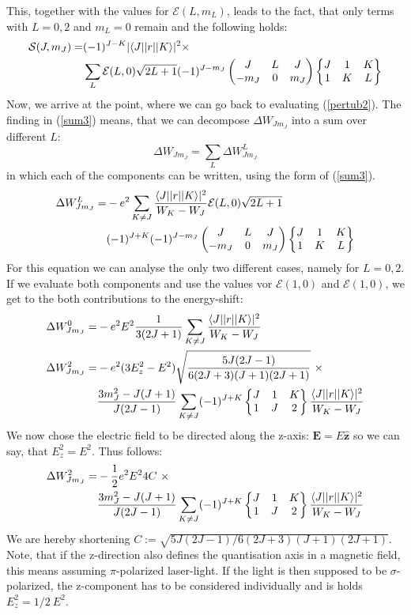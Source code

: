 This, together with the values for $\mathcal{E}(L,m_L)$, leads to the fact, that only terms with $L=0,2$ and $m_L=0$ remain and the following holds:
\begin{align}
\mathcal{S}(J,m_J)=&(-1)^{J-K}|\langle J| |r| | K\rangle|^2\times\notag\\&\sum_{L}\mathcal{E}(L,0)\sqrt{2L+1} (-1)^{J-m_J}\begin{pmatrix}J&L&J\\-m_J&0&m_J\end{pmatrix}\begin{Bmatrix}J&1&K\\1&K&L\end{Bmatrix}\label{sum3}
\end{align}
Now, we arrive at the point, where we can go back to evaluating (\ref{pertub2}). The finding in (\ref{sum3}) means, that we can decompose $\Delta W_{Jm_J}$ into a sum over different $L$:
\begin{equation}
\Delta W_{Jm_J}=\sum_L\Delta W^L_{Jm_J}
\end{equation}
in which each of the components can be written, using the form of (\ref{sum3}).
\begin{align}
\Delta W^L_{Jm_J}=&-e^2\sum_{K\neq J}\frac{\langle J| |r| | K\rangle|^2}{W_K-W_J}\mathcal{E}(L,0)\sqrt{2L+1}\notag\\&(-1)^{J+K} (-1)^{J-m_J}\begin{pmatrix}J&L&J\\-m_J&0&m_J\end{pmatrix}\begin{Bmatrix}J&1&K\\1&K&L\end{Bmatrix}\label{pertub4}
\end{align}
For this equation we can analyse the only two different cases, namely for $L=0,2$. If we evaluate both components and use the values vor $\mathcal{E}(1,0)$ and $\mathcal{E}(1,0)$, we get to the both contributions to the energy-shift:
\begin{align}
\Delta W^0_{Jm_J}=&-e^2E^2\frac{1}{3(2J+1)}\sum_{K\neq J}\frac{\braopket{J}{|r|}{K}|^2}{W_K-W_J}\\
\Delta W^2_{Jm_J}=&-e^2(3E^2_z-E^2)\sqrt{\frac{5J(2J-1)}{6(2J+3)(J+1)(2J+1)}}\ \times\notag\\
&\frac{3m^2_J-J(J+1)}{J(2J-1)}\sum_{K\neq J}(-1)^{J+K}\sixj{J}{1}{K}{1}{J}{2}\frac{\braopket{J}{|r|}{K}|^2}{W_K-W_J}
\end{align}
We now chose the electric field to be directed along the z-axis: $\boldsymbol{E}=E\hat{\boldsymbol{z}}$ so we can say, that $E^2_z=E^2$. Thus follows:
\begin{align}
\Delta W^2_{Jm_J}=&-\frac{1}{2}e^2E^24C\ \times\notag\\
&\frac{3m^2_J-J(J+1)}{J(2J-1)}\sum_{K\neq J}(-1)^{J+K}\begin{Bmatrix}J&1&K\\1&J&2\end{Bmatrix}\frac{\langle J| |r| | K\rangle|^2}{W_K-W_J}\label{alpha21}
\end{align}
We are hereby shortening $C:=\sqrt{5J(2J-1)/6(2J+3)(J+1)(2J+1)}$.
Note, that if the z-direction also defines the quantisation axis in a magnetic field, this means assuming $\pi$-polarized laser-light. If the light is then supposed to be $\sigma$-polarized, the z-component has to be considered individually and is holds $E^2_z=1/2\ E^2$.
